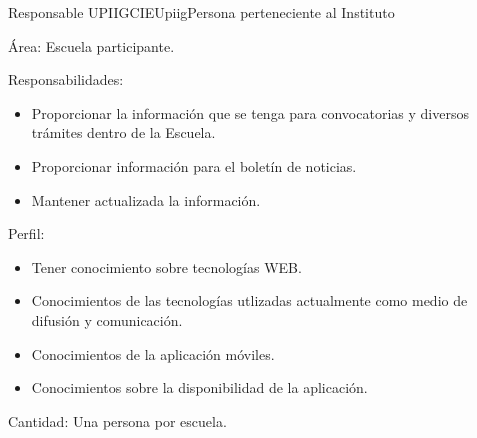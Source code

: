 \begin{actor}{Responsable UPIIG}{CIEUpiig}{Persona perteneciente al Instituto }
	
	\item[Área:] Escuela participante.
	\item[Responsabilidades:] \hspace{1pt}
	
	\begin{itemize}
		
		\item Proporcionar la información que se tenga para convocatorias y diversos trámites dentro de la Escuela.
		\item Proporcionar información para el boletín de noticias.
		\item Mantener actualizada la información.
		
		
	\end{itemize}
	
	\item[Perfil:] \hspace{1pt}
	
	\begin{itemize}
		
		\item Tener conocimiento sobre tecnologías WEB.
		\item Conocimientos de las tecnologías utlizadas actualmente como medio de difusión y comunicación.
		\item Conocimientos de la aplicación móviles.
		\item Conocimientos sobre la disponibilidad de la aplicación.	
	\end{itemize}
	
	\item[Cantidad:] Una persona por escuela.
	
\end{actor}
%
%
%
%
